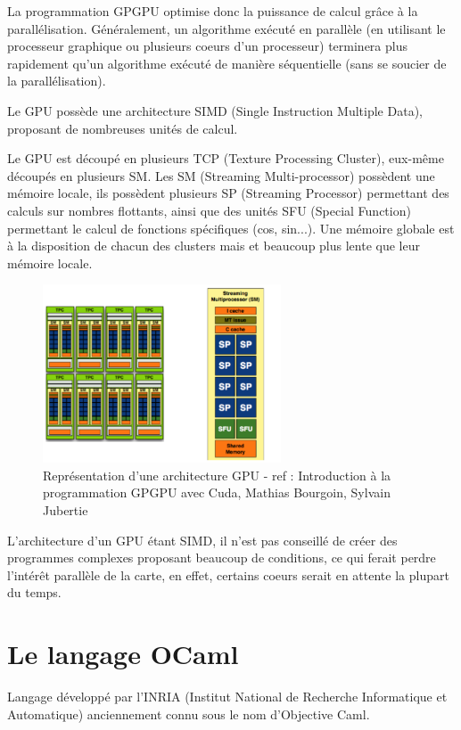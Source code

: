 \documentclass{report}
\begin{document}
La programmation GPGPU optimise donc la puissance de calcul grâce à la parallélisation. Généralement, un algorithme exécuté en parallèle (en utilisant le processeur graphique ou plusieurs coeurs d'un processeur) terminera plus rapidement qu'un algorithme exécuté de manière séquentielle (sans se soucier de la parallélisation).  \newline

Le GPU possède une architecture SIMD (Single Instruction Multiple Data), proposant de nombreuses unités de calcul. \newline

Le GPU est découpé en plusieurs TCP (Texture Processing Cluster), eux-même découpés en plusieurs SM. Les SM (Streaming Multi-processor) possèdent une mémoire locale, ils possèdent plusieurs SP (Streaming Processor) permettant des calculs sur nombres flottants, ainsi que des unités SFU (Special Function) permettant le calcul de fonctions spécifiques (cos, sin...). Une mémoire globale est à la disposition de chacun des clusters mais et beaucoup plus lente que leur mémoire locale. \newline

\begin{figure}[!h]
\begin{center}
\includegraphics[height=150pt]{images_finales/image2.png}
\end{center}
\caption{Représentation d'une architecture GPU - ref : Introduction à la programmation GPGPU avec Cuda, Mathias Bourgoin, Sylvain Jubertie}
\label{test2}
\end{figure}

L'architecture d'un GPU étant SIMD, il n'est pas conseillé de créer des programmes complexes proposant beaucoup de conditions, ce qui ferait perdre l'intérêt parallèle de la carte, en effet, certains coeurs serait en attente la plupart du temps.

\section{Le langage OCaml}
Langage développé par l'INRIA (Institut National de Recherche Informatique et Automatique) anciennement connu sous le nom d'Objective Caml.\newline
\end{document}
